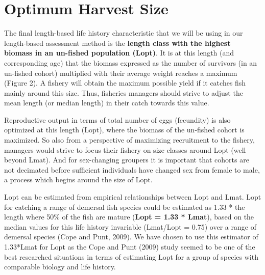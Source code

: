 \section{Optimum Harvest Size}
The final length-based life history characteristic that we will be using in our length-based assessment method is the \textbf{length class with the highest biomass in an un-fished population (Lopt)}. It is at this length (and corresponding age) that the biomass expressed as the number of survivors (in an un-fished cohort) multiplied with their average weight reaches a maximum (Figure 2). A fishery will obtain the maximum possible yield if it catches fish mainly around this size. Thus, fisheries managers should strive to adjust the mean length (or median length) in their catch towards this value.

Reproductive output in terms of total number of eggs (fecundity) is also optimized at this length (Lopt), where the biomass of the un-fished cohort is maximized. So also from a perspective of maximizing recruitment to the fishery, managers would strive to focus their fishery on size classes around Lopt (well beyond Lmat). And for sex-changing groupers it is important that cohorts are not decimated before sufficient individuals have changed sex from female to male, a process which begins around the size of Lopt.

Lopt can be estimated from empirical relationships between Lopt and Lmat. Lopt for catching a range of demersal fish species could be estimated as 1.33 * the length where 50\% of the fish are mature (\textbf{Lopt = 1.33 * Lmat}), based on the median values for this life history invariable (Lmat/Lopt = 0.75) over a range of demersal species (Cope and Punt, 2009). We have chosen to use this estimator of 1.33*Lmat for Lopt as the Cope and Punt (2009) study seemed to be one of the best researched situations in terms of estimating Lopt for a group of species with comparable biology and life history.

